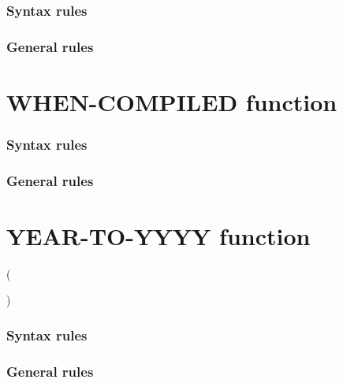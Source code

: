 \subsubsection{Syntax rules}

\subsubsection{General rules}

\section{WHEN-COMPILED function}

\begin{syntax}
   
\end{syntax}

\subsubsection{Syntax rules}

\subsubsection{General rules}

\section{YEAR-TO-YYYY function}

\begin{syntax}
    ( \argument
  \begin{0-1}
    \argument
    \begin{0-1}
      \argument
    \end{0-1}
  \end{0-1}
  )
\end{syntax}

\subsubsection{Syntax rules}

\subsubsection{General rules}

